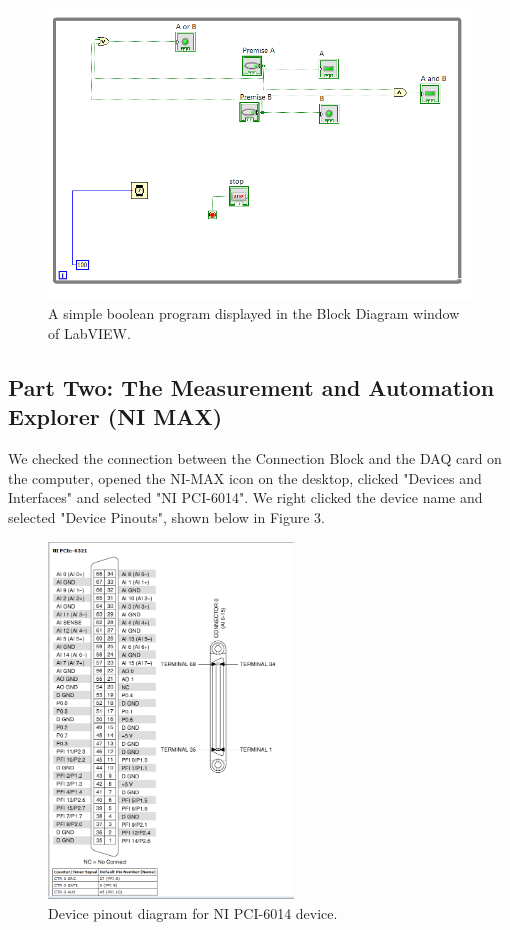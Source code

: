 \documentclass[twoside,10pt]{article}
\begin{document}
\begin{multicols}{2}
			\begin{figure}[H]
			\centering
			\includegraphics[width=\linewidth]{boolean block diagram group 4.png}
			\caption{A simple boolean program displayed in the Block Diagram window of LabVIEW.}
		\end{figure}
		
		
		\subsection*{Part  Two: The Measurement and Automation Explorer (NI MAX)}
		
		We checked the connection between the Connection Block and the DAQ card on the computer, opened the NI-MAX icon on the desktop, clicked "Devices and Interfaces" and selected "NI PCI-6014". We right clicked the device name and selected "Device Pinouts", shown below in Figure 3.
		
			\begin{figure}[H]
			\centering
			\includegraphics[width=65mm]{group 4 part 2 device pin outs.png}
			\caption{Device pinout diagram for NI PCI-6014 device.}
		\end{figure}
		

\end{multicols}
\end{document}
